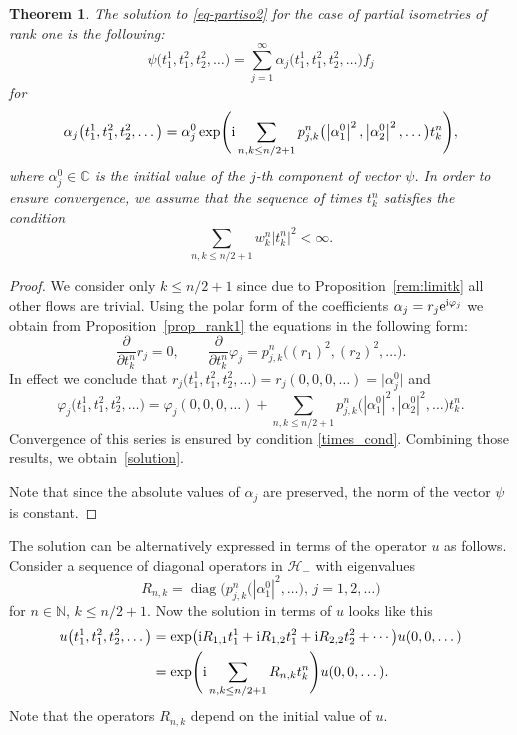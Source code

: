 \documentclass[pdftex]{sigma}
\newtheorem{thm}{Theorem}[section]
\theoremstyle{definition}
\numberwithin{equation}{section}
\newcommand{\C}{\mathbb C}
\newcommand{\N}{\mathbb N}
\renewcommand{\H}{\mathcal{H}}
\newcommand{\abs}[1]{\left\vert#1\right\vert}
\newcommand{\be}{\begin{equation}}
\newcommand{\ee}{\end{equation}}
\begin{document}
\begin{thm}\label{thm-rank1}
The solution to \eqref{eq-partiso2} for the case of partial isometries of rank one is the following:
\[\psi\bigl(t_1^1,t_1^2,t_2^2,\dots\bigr) = \sum_{j=1}^\infty \alpha_j\bigl(t_1^1,t_1^2,t_2^2,\dots\bigr) f_j\]
for
\begin{equation}\label{solution}
\alpha_j\bigl(t_1^1,t_1^2,t_2^2,\dots\bigr) = \alpha_j^0 \exp\Biggl({{\rm i} \sum_{n,k\leq n/2+1} p_{j,k}^n\bigl(\abs{\alpha_1^0}^2,\abs{\alpha_2^0}^2,\dots\bigr)t^n_k}\Biggr),
\end{equation}
where $\alpha_j^0\in\C$ is the initial value of the $j$-th component of vector $\psi$. In order to ensure convergence, we assume that the sequence of times $t^n_k$ satisfies the condition
\be \label{times_cond} \sum_{n,k\leq n/2+1} w^n_k \abs{t^n_k}^2 < \infty. \ee
\end{thm}
\begin{proof}We consider only $k\leq n/2+1$ since due to Proposition~\ref{rem:limitk} all other flows are trivial.
Using the polar form of the coefficients
$\alpha_j = r_j {\rm e}^{{\rm i}\varphi_j}$
we obtain from Proposition~\ref{prop_rank1} the equations in the following form:
\[
 \frac\partial{\partial t^n_k} r_j = 0 ,\qquad
 \frac\partial{\partial t^n_k} \varphi_j = p_{j,k}^n\bigl((r_1)^2,(r_2)^2,\dots\bigr).
\]
In effect we conclude that
$r_j\bigl(t_1^1,t_1^2,t_2^2,\dots\bigr) = r_j(0, 0, 0, \dots) = \bigl|\alpha_j^0\bigr|$
and
\[\varphi_j\bigl(t_1^1,t_1^2,t_2^2,\dots\bigr)
= \varphi_j(0, 0, 0, \dots) + \sum\limits_{{n,k\leq n/2+1}} p_{j,k}^n\bigl(|\alpha_1^0|^2,|\alpha_2^0|^2,\dots\bigr)t^n_k.\]
Convergence of this series is ensured by condition \eqref{times_cond}.
Combining those results, we obtain~\eqref{solution}.

Note that since the absolute values of $\alpha_j$ are preserved, the norm of the vector $\psi$ is constant.
\end{proof}

The solution can be alternatively expressed in terms of the operator $u$ as follows. Consider a sequence of diagonal operators in $\H_-$ with eigenvalues
\[
R_{n,k}=\operatorname{diag}\bigl(
p_{j,k}^n\bigl(\abs{\alpha_1^0}^2,\dots\bigr),\, j=1,2,\dots\bigr)
\]
for $n\in\N$, $k\leq n/2+1$.
Now the solution in terms of $u$ looks like this
\begin{align*}
u\bigl(t_1^1,t_1^2,t_2^2,\dots\bigr)&= \exp\bigl({\rm i}R_{1,1}{t_1^1}+
{\rm i}R_{1,2}{t_1^2}+{\rm i}R_{2,2}{t_2^2}+\cdots\bigr) u(0,0,\dots)\\
& =\exp\Biggl({{\rm i}\sum\limits_{{n,k\leq n/2+1}} R_{n,k}t^n_k}\Biggr)u(0,0,\dots). \end{align*}
Note that the operators $R_{n,k}$ depend on the initial value of $u$.
\end{document}
